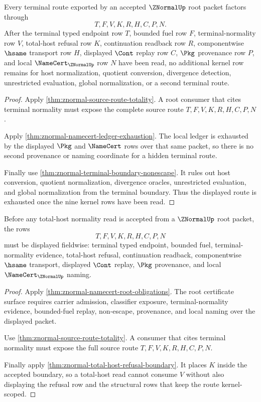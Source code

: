 \begin{theorem}
\label{thm:znormal-terminal-route-exhaustion}
Every terminal route exported by an accepted $\ZNormalUp$ root packet factors through
$$
T,F,V,K,R,H,C,P,N.
$$
After the terminal typed endpoint row $T$, bounded fuel row $F$, terminal-normality row $V$, total-host refusal row $K$, continuation readback row $R$, componentwise $\hsame$ transport row $H$, displayed $\Cont$ replay row $C$, $\Pkg$ provenance row $P$, and local $\NameCert_{\ZNormalUp}$ row $N$ have been read, no additional kernel row remains for host normalization, quotient conversion, divergence detection, unrestricted evaluation, global normalization, or a second terminal route.
\end{theorem}
\begin{proof}
Apply \autoref{thm:znormal-source-route-totality}. A root consumer that cites terminal normality must expose the complete source route $T,F,V,K,R,H,C,P,N$.

Apply \autoref{thm:znormal-namecert-ledger-exhaustion}. The local ledger is exhausted by the displayed $\Pkg$ and $\NameCert$ rows over that same packet, so there is no second provenance or naming coordinate for a hidden terminal route.

Finally use \autoref{thm:znormal-terminal-boundary-nonescape}. It rules out host conversion, quotient normalization, divergence oracles, unrestricted evaluation, and global normalization from the terminal boundary. Thus the displayed route is exhausted once the nine kernel rows have been read.
\end{proof}

\begin{theorem}
\label{thm:znormal-total-host-field-readiness}
Before any total-host normality read is accepted from a $\ZNormalUp$ root packet, the rows
$$
T,F,V,K,R,H,C,P,N
$$
must be displayed fieldwise: terminal typed endpoint, bounded fuel, terminal-normality evidence, total-host refusal, continuation readback, componentwise $\hsame$ transport, displayed $\Cont$ replay, $\Pkg$ provenance, and local $\NameCert_{\ZNormalUp}$ naming.
\end{theorem}
\begin{proof}
Apply \autoref{thm:znormal-namecert-root-obligations}. The root certificate surface requires carrier admission, classifier exposure, terminal-normality evidence, bounded-fuel replay, non-escape, provenance, and local naming over the displayed packet.

Use \autoref{thm:znormal-source-route-totality}. A consumer that cites terminal normality must expose the full source route $T,F,V,K,R,H,C,P,N$.

Finally apply \autoref{thm:znormal-total-host-refusal-boundary}. It places $K$ inside the accepted boundary, so a total-host read cannot consume $V$ without also displaying the refusal row and the structural rows that keep the route kernel-scoped.
\end{proof}


